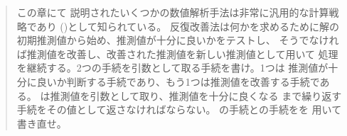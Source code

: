 \begin{quote}
 この章にて
説明されたいくつかの数値解析手法は非常に汎用的な計算戦略であり
()として知られている。
反復改善法は何かを求めるために解の初期推測値から始め、推測値が十分に良いかをテストし、
そうでなければ推測値を改善し、改善された推測値を新しい推測値として用いて
処理を継続する。2つの手続を引数として取る手続を書け。1つは
推測値が十分に良いか判断する手続であり、もう1つは推測値を改善する手続である。
は推測値を引数として取り、推測値を十分に良くなる
まで繰り返す手続をその値として返さなければならない。
の手続との手続をを
用いて書き直せ。
\end{quote}
